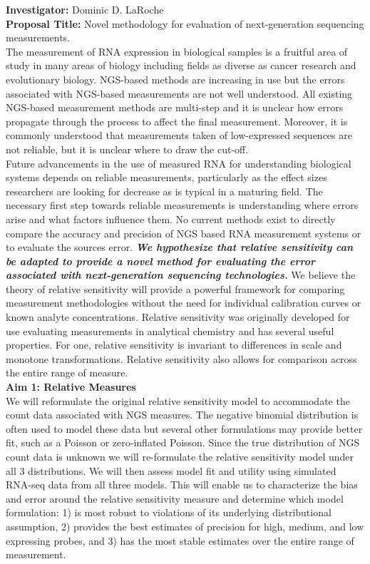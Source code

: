 \documentclass{article}\usepackage[]{graphicx}\usepackage[]{color}
\begin{document}
\noindent\textbf{Investigator:} Dominic D. LaRoche\\
\noindent\textbf{Proposal Title:} Novel methodology for evaluation of next-generation sequencing measurements.\\

The measurement of RNA expression in biological samples is a fruitful area of study in many areas of biology including fields as diverse as cancer research and evolutionary biology. NGS-based methods are increasing in use but the errors associated with NGS-based measurements are not well understood.  All existing NGS-based measurement methods are multi-step and it is unclear how errors propagate through the process to affect the final measurement.  Moreover, it is commonly understood that measurements taken of low-expressed sequences are not reliable, but it is unclear where to draw the cut-off.\\

Future advancements in the use of measured RNA for understanding biological systems depends on reliable measurements, particularly as the effect sizes researchers are looking for decrease as is typical in a maturing field.  The necessary first step towards reliable measurements is understanding where errors arise and what factors influence them. No current methods exist to directly compare the accuracy and precision of NGS based RNA measurement systems or to evaluate the sources error.
\textbf{\emph{We hypothesize that relative sensitivity can be adapted to provide a novel method for evaluating the error associated with next-generation sequencing technologies.}}  
We believe the theory of relative sensitivity will provide a powerful framework for comparing measurement methodologies without the need for individual calibration curves or known analyte concentrations.  Relative sensitivity was originally developed for use evaluating measurements in analytical chemistry and has several useful properties. For one, relative sensitivity is invariant to differences in scale and monotone transformations.  Relative sensitivity also allows for comparison across the entire range of measure. \\
 
\noindent\textbf{Aim 1: Relative Measures}\\
We will reformulate the original relative sensitivity model to accommodate the count data associated with NGS measures.  The negative binomial distribution is often used to model these data but several other formulations may provide better fit, such as a Poisson or zero-inflated Poisson.  Since the true distribution of NGS count data is unknown we will re-formulate the relative sensitivity model under all 3 distributions.  We will then assess model fit and utility using simulated RNA-seq data from all three models.  This will enable us to characterize the bias and error around the relative sensitivity measure and determine which model formulation: 1)  is most robust to violations of its underlying distributional assumption, 2) provides the best estimates of precision for high, medium, and low expressing probes, and 3) has the most stable estimates over the entire range of measurement.\\
\end{document}
